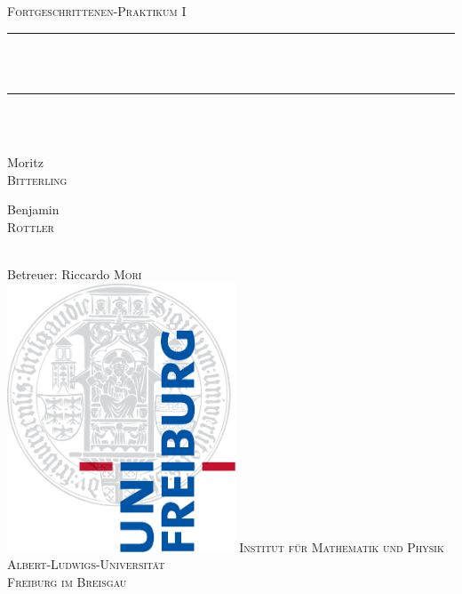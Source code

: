 \newcommand{\HRule}{\rule{\linewidth}{0.5mm}}
\begin{titlepage}
\begin{center}
  \textsc{\Large Fortgeschrittenen-Praktikum I}\\[0.5cm]
  \HRule \\[0.4cm]
  { \huge \bfseries \exptitle}\\
  \HRule \\[0.5cm]
  \large \expdate\\[0.5cm]  
  \begin{minipage}{0.4\textwidth}
    \begin{flushleft} \large
      Moritz \\ \textsc{Bitterling}
    \end{flushleft}
  \end{minipage}
  \hfill
  \begin{minipage}{0.4\textwidth}
    \begin{flushright} \large
      Benjamin \\ \textsc{Rottler}
    \end{flushright}
  \end{minipage}
  \\[1cm]
  \large 
  Betreuer: Riccardo \textsc{Mori} \\[3cm]
  \includegraphics[height=8cm]{../../img/logo_uni.pdf}
  \vfill
  \normalsize
  \textsc{Institut für Mathematik und Physik} \\
  \textsc{Albert-Ludwigs-Universität} \\
  \textsc{Freiburg im Breisgau}
\end{center}
\end{titlepage}